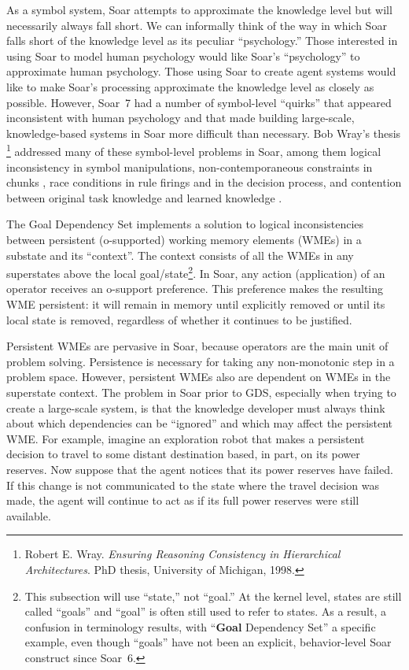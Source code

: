 As a symbol system, Soar attempts to approximate the knowledge level
but will necessarily always fall short\cite{Newell90:UTC}.  We can
informally think of the way in which Soar falls short of the knowledge
level as its peculiar ``psychology.''  Those interested in using Soar
to model human psychology would like Soar's ``psychology'' to
approximate human psychology. Those using Soar to create agent
systems would like to make Soar's processing approximate the knowledge
level as closely as possible. However, Soar~7 had a number of
symbol-level ``quirks'' that appeared inconsistent with human
psychology and that made building large-scale, knowledge-based systems
in Soar more difficult than necessary.  Bob Wray's thesis 
\footnote{Robert E. Wray. \textit{Ensuring Reasoning Consistency in Hierarchical Architectures}. PhD thesis, University of Michigan, 1998.}
addressed many of these symbol-level problems
in Soar, among them logical inconsistency in symbol manipulations,
non-contemporaneous constraints in chunks \cite{Wray96:Compilation},
race conditions in rule firings and in the decision process, and
contention between original task knowledge and learned knowledge
\cite{Wray01:Resolving}.

The Goal Dependency Set implements a solution to logical
inconsistencies between persistent (o-supported) working memory
elements (WMEs) in a substate and its ``context''. The context
consists of all the WMEs in any superstates above the local
goal/state\footnote{This subsection will use ``state,'' not ``goal.''  At
	the kernel level, states are still called ``goals'' and ``goal'' is often
	still used to refer to states. As a result, a confusion in terminology results, 
	with ``\textbf{Goal} Dependency Set'' a specific example, even though ``goals'' 
	have not been an explicit, behavior-level Soar construct since Soar~6.}. In Soar, any
action (application) of an operator receives an o-support preference.
This preference makes the resulting WME persistent: it will remain in
memory until explicitly removed or until its local state is removed,
regardless of whether it continues to be justified.

Persistent WMEs are pervasive in Soar, because operators are the main
unit of problem solving. Persistence is necessary for taking any
non-monotonic step in a problem space. However, persistent WMEs also
are dependent on WMEs in the superstate context. The problem in
Soar prior to GDS, especially when trying to create a large-scale system\cite{Jones99:Automated}, is that the knowledge developer
must always think about which dependencies can be ``ignored'' and
which may affect the persistent WME. For
example, imagine an exploration robot that makes a persistent decision
to travel to some distant destination based, in part, on its power
reserves.  Now suppose that the agent notices that its power reserves
have failed.  If this change is not communicated to the state where
the travel decision was made, the agent will continue to act as if its
full power reserves were still available.

